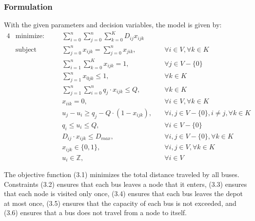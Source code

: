 \documentclass[12pt]{article}
\begin{document}
\subsubsection{Formulation}
With the given parameters and decision variables, the model is given by:
\begin{alignat}{4}
     & \text{minimize:}   &       & \sum_{i=0}^{n} \sum_{j=0}^{n} \sum_{k=0}^{K} D_{ij} x_{ijk}                                                              \\
     & \text{subject to:} & \quad & \sum_{j=0}^{n} x_{ijk} = \sum_{j=0}^{n} x_{jik},            & \quad \forall i \in V, \forall k \in K                     \\
     &                    & \quad & \sum_{i=1}^{n} \sum_{k=0}^K x_{ijk} = 1,                    & \quad \forall j \in V - \{0\}                              \\
     &                    & \quad & \sum_{j=1}^{n} x_{0jk} \leq 1,                              & \quad \forall k \in K                                      \\
     &                    & \quad & \sum_{j=1}^{n} \sum_{i=0}^{n} q_j \cdot x_{ijk} \leq Q,     & \quad \forall k \in K                                      \\
     &                    & \quad & x_{iik} = 0,                                                & \quad \forall i \in V, \forall k \in K                     \\
     &                    & \quad & u_j - u_i \geq q_j - Q \cdot (1 - x_{ijk}),                 & \quad \forall i,j \in V - \{0\}, i \neq j, \forall k \in K \\
     &                    & \quad & q_i \leq u_i \leq Q,                                        & \quad \forall i \in V - \{0\}                              \\
     &                    & \quad & D_{ij} \cdot x_{ijk} \leq D_{max},                          & \quad \forall i,j \in V - \{0\}, \forall k \in K           \\
     &                    & \quad & x_{ijk} \in \{0,1\},                                        & \quad \forall i,j \in V, \forall k \in K                   \\
     &                    & \quad & u_i \in \mathbb{Z},                                         & \quad \forall i \in V
\end{alignat}

The objective function (3.1) minimizes the total distance traveled by all buses. Constraints (3.2) ensures that each bus leaves a node that it enters,
(3.3) ensures that each node is visited only once,
(3.4) ensures that each bus leaves the depot at most once,
(3.5) ensures that the capacity of each bus is not exceeded,
and (3.6) ensures that a bus does not travel from a node to itself.
\end{document}

